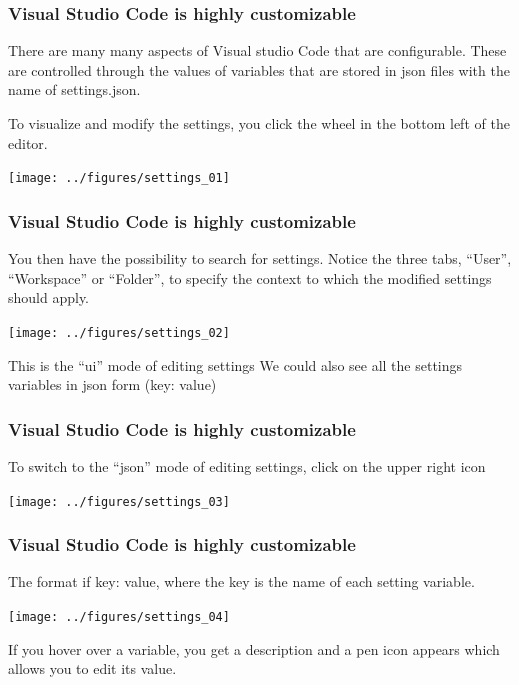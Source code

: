 \documentclass[9pt]{beamer}
\begin{document}
\begin{frame}
  \frametitle{Visual Studio Code is highly customizable}
  \begin{block}{}There are many many aspects of Visual studio Code that are
  configurable. These are controlled through the values of variables
  that are stored in json files with the name of settings.json.
  \end{block}\pause
  To visualize and modify the  settings, you click the wheel in the bottom left of
  the editor.
  \
  \begin{center}
    \texttt{[image: ../figures/settings\_01]}
  \end{center}
\end{frame}
\begin{frame}
  \frametitle{Visual Studio Code is highly customizable}
  You then have the possibility to search for settings. Notice the three
  tabs, ``User'', ``Workspace'' or ``Folder'', to specify the context to
  which the modified settings should apply.
  \begin{center}
    \texttt{[image: ../figures/settings\_02]}
  \end{center}\pause
  \begin{block}{This is the ``ui'' mode of editing settings} We could also see
    all the settings variables in json form (key: value)
  \end{block}
\end{frame}
\begin{frame}
  \frametitle{Visual Studio Code is highly customizable}
  To switch to the ``json'' mode of editing settings, click on the
  upper right icon
  \begin{center}
    \texttt{[image: ../figures/settings\_03]}
  \end{center}
\end{frame}
\begin{frame}
  \frametitle{Visual Studio Code is highly customizable}
  \begin{overlayarea}{\textwidth}{\textheight}
    The format if key: value, where the key is the name of each setting variable.
    \begin{center}
      \texttt{[image: ../figures/settings\_04]}
    \end{center}\pause
    
    If you hover over a variable, you get a description and a pen icon
    appears which allows you to edit its value.
  \end{overlayarea}
\end{frame}
\end{document}
